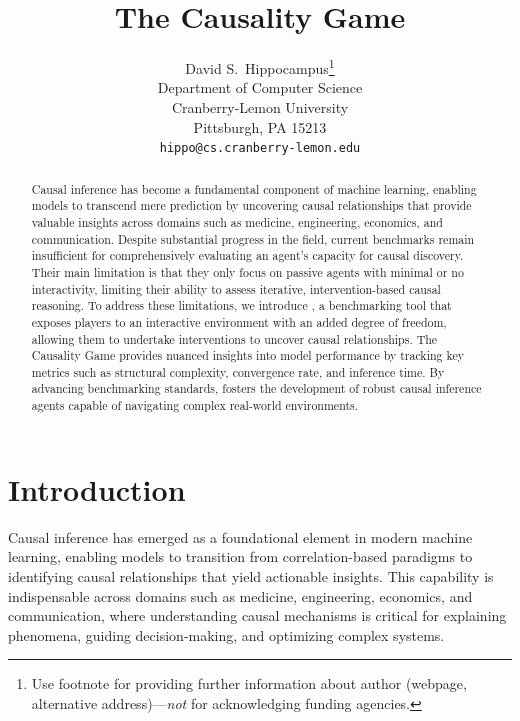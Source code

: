 \documentclass{article}
\title{The Causality Game}
\author{%
  David S.~Hippocampus\thanks{Use footnote for providing further information
    about author (webpage, alternative address)---\emph{not} for acknowledging
    funding agencies.} \\
  Department of Computer Science\\
  Cranberry-Lemon University\\
  Pittsburgh, PA 15213 \\
  \texttt{hippo@cs.cranberry-lemon.edu} \\
}
\begin{document}
\maketitle




















\begin{abstract}
    Causal inference has become a fundamental component of machine learning, enabling models to transcend mere prediction by uncovering causal relationships that provide valuable insights across domains such as medicine, engineering, economics, and communication. 
    Despite substantial progress in the field, current benchmarks remain insufficient for comprehensively evaluating an agent’s capacity for causal discovery. 
    Their main limitation is that they only focus on passive agents with minimal or no interactivity, limiting their ability to assess iterative, intervention-based causal reasoning.
    To address these limitations, we introduce \game, a benchmarking tool that exposes players to an interactive environment with an added degree of freedom, allowing them to undertake interventions to uncover causal relationships. 
    The Causality Game provides nuanced insights into model performance by tracking key metrics such as structural complexity, convergence rate, and inference time. 
    By advancing benchmarking standards, \game fosters the development of robust causal inference agents capable of navigating complex real-world environments.
\end{abstract}







\section{Introduction}
    Causal inference has emerged as a foundational element in modern machine learning, enabling models to transition from correlation-based paradigms to identifying causal relationships that yield actionable insights. 
    This capability is indispensable across domains such as medicine, engineering, economics, and communication, where understanding causal mechanisms is critical for explaining phenomena, guiding decision-making, and optimizing complex systems.
\end{document}
